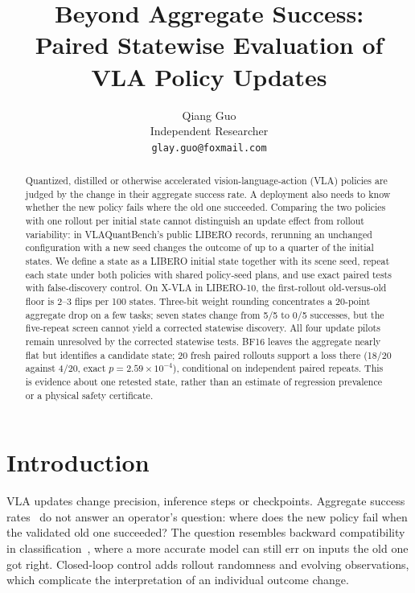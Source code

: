 \documentclass{article}
\title{Beyond Aggregate Success:\\Paired Statewise Evaluation of VLA Policy Updates}
\author{Qiang Guo\\Independent Researcher\\\texttt{glay.guo@foxmail.com}}
\begin{document}
\raggedbottom
\maketitle

\begin{abstract}
Quantized, distilled or otherwise accelerated vision-language-action (VLA) policies are judged by
the change in their aggregate success rate. A deployment also needs to know whether the new policy
fails where the old one succeeded. Comparing the two policies with one rollout per initial state
cannot distinguish an update effect from rollout variability: in VLAQuantBench's public LIBERO
records, rerunning an unchanged configuration with a new seed changes the outcome of up to a
quarter of the initial states. We define a state as a LIBERO initial state together with its scene
seed, repeat each state under both policies with shared policy-seed plans, and use exact paired
tests with false-discovery control. On X-VLA in LIBERO-10, the first-rollout old-versus-old floor
is 2--3 flips per 100 states. Three-bit weight rounding concentrates a 20-point aggregate drop
on a few tasks; seven states change from 5/5 to 0/5 successes, but the five-repeat screen cannot
yield a corrected statewise discovery. All four update pilots remain unresolved by the
corrected statewise tests. BF16 leaves the aggregate nearly flat but identifies a candidate
state; 20 fresh paired rollouts support a loss there (18/20 against 4/20, exact
$p=2.59\times10^{-4}$), conditional on independent paired repeats. This is evidence
about one retested state, rather than an estimate of regression prevalence or a physical
safety certificate.
\end{abstract}

\section{Introduction}
VLA updates change precision, inference steps or checkpoints. Aggregate success
rates~\citep{xu2026vlaquantbench} do not answer an operator's question: where does the new
policy fail when the validated old one succeeded? The question resembles backward compatibility
in classification~\citep{bansal2019updates,srivastava2020compat,yan2021pcr}, where a more accurate
model can still err on inputs the old one got right. Closed-loop control adds rollout randomness
and evolving observations, which complicate the interpretation of an individual outcome change.
\end{document}
